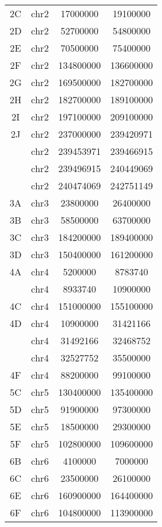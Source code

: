 \begin{center}
\begin{longtable}{@{\extracolsep{\fill}}cccc}
  2C     & chr2       & 17000000  & 19100000 \\
  2D     & chr2       & 52700000  & 54800000 \\
  2E     & chr2       & 70500000  & 75400000 \\
  2F     & chr2       & 134800000 & 136600000 \\
  2G     & chr2       & 169500000 & 182700000 \\
  2H     & chr2       & 182700000 & 189100000 \\
  2I     & chr2       & 197100000 & 209100000 \\
  2J     & chr2       & 237000000 & 239420971 \\
         & chr2       & 239453971 & 239466915 \\
         & chr2       & 239496915 & 240449069 \\
         & chr2       & 240474069 & 242751149 \\
  3A     & chr3       & 23800000  & 26400000 \\
  3B     & chr3       & 58500000  & 63700000 \\
  3C     & chr3       & 184200000 & 189400000 \\
  3D     & chr3       & 150400000 & 161200000 \\
  4A     & chr4       & 5200000   & 8783740 \\
         & chr4       & 8933740   & 10900000 \\
  4C     & chr4       & 151000000 & 155100000 \\
  4D     & chr4       & 10900000  & 31421166 \\
         & chr4       & 31492166  & 32468752 \\
         & chr4       & 32527752  & 35500000 \\
  4F     & chr4       & 88200000  & 99100000 \\
  5C     & chr5       & 130400000 & 135400000 \\
  5D     & chr5       & 91900000  & 97300000 \\
  5E     & chr5       & 18500000  & 29300000 \\
  5F     & chr5       & 102800000 & 109600000 \\
  6B     & chr6       & 4100000   & 7000000 \\
  6C     & chr6       & 23500000  & 26100000 \\
  6E     & chr6       & 160900000 & 164400000 \\
  6F     & chr6       & 104800000 & 113900000 \\

\end{longtable}
\end{center}
